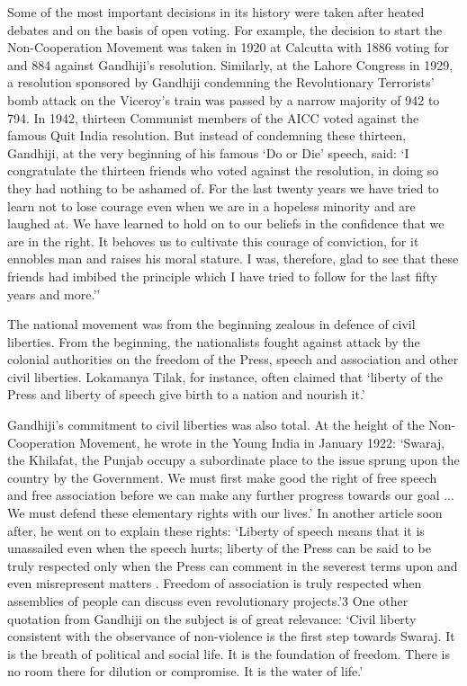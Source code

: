 Some of the most important decisions in its history were taken after heated debates and on the basis of open voting. For example, the decision to start the Non-Cooperation Movement was taken in 1920 at Calcutta with 1886 voting for and 884 against Gandhiji's resolution. Similarly, at the Lahore Congress in 1929, a resolution sponsored by Gandhiji condemning the Revolutionary Terrorists' bomb attack on the Viceroy's train was passed by a narrow majority of 942 to 794. In 1942, thirteen Communist members of the AICC voted against the famous Quit India resolution. But instead of condemning these thirteen, Gandhiji, at the very beginning of his famous `Do or Die' speech, said: `I congratulate the thirteen friends who voted against the resolution, in doing so they had nothing to be ashamed of. For the last twenty years we have tried to learn not to lose courage even when we are in a hopeless minority and are laughed at. We have learned to hold on to our beliefs in the confidence that we are in the right. It behoves us to cultivate this courage of conviction, for it ennobles man and raises his moral stature. I was, therefore, glad to see that these friends had imbibed the principle which I have tried to follow for the last fifty years and more.''

The national movement was from the beginning zealous in defence of civil liberties. From the beginning, the nationalists fought against attack by the colonial authorities on the freedom of the Press, speech and association and other civil liberties. Lokamanya Tilak, for instance, often claimed that `liberty of the Press and liberty of speech give birth to a nation and nourish it.'

Gandhiji's commitment to civil liberties was also total. At the height of the Non-Cooperation Movement, he wrote in the Young India in January 1922: `Swaraj, the Khilafat, the Punjab occupy a subordinate place to the issue sprung upon the country by the Government. We must first make good the right of free speech and free association before we can make any further progress towards our goal ... We must defend these elementary rights with our lives.' In another article soon after, he went on to explain these rights: `Liberty of speech means that it is unassailed even when the speech hurts; liberty of the Press can be said to be truly respected only when the Press can comment in the severest terms upon and even misrepresent matters . Freedom of association is truly respected when assemblies of people can discuss even revolutionary projects.'3 One other quotation from Gandhiji on the subject is of great relevance: `Civil liberty consistent with the observance of non-violence is the first step towards Swaraj. It is the breath of political and social life. It is the foundation of freedom. There is no room there for dilution or compromise. It is the water of life.'

